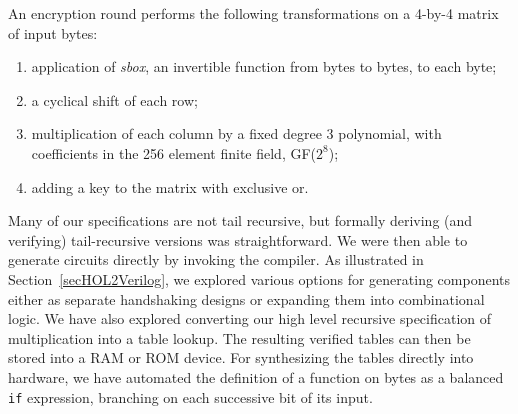 \documentclass{llncs}
\begin{document}
An encryption round performs the following transformations on a 4-by-4 matrix
of input bytes:
\begin{enumerate}
\item
application of \emph{sbox}, an invertible function from bytes to bytes,
to each byte;
\item
a cyclical shift of each row;
\item
multiplication of each column by a fixed degree 3 polynomial, with coefficients
in the 256 element finite field, GF($2^8$);
\item
adding a key to the matrix with exclusive or.
\end{enumerate}


Many of our specifications are not tail recursive, but formally
deriving (and verifying) tail-recursive versions was
straightforward. We were then able to generate circuits directly by invoking
the compiler.  As illustrated in
Section~\ref{secHOL2Verilog}, we explored various options for
generating components either as separate handshaking designs or expanding
them into combinational logic. We have also explored converting our
high level recursive specification of multiplication into a table
lookup. The resulting verified tables can then be stored into a RAM or
ROM device.  For synthesizing the tables directly into hardware, we
have automated the definition of a function on bytes as a balanced
\texttt{if} expression, branching on each successive bit of its input.
\end{document}
